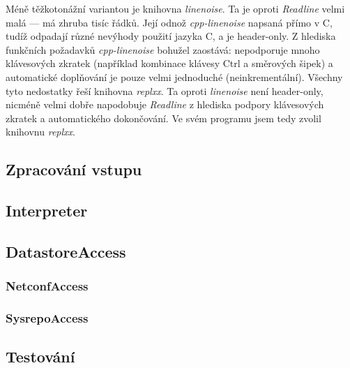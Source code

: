 \documentclass[thesis=B,czech]{FITthesis}[2019/03/06]
\newcommand{\Rplus}{\protect\hspace{-.1em}\protect\raisebox{.35ex}{\smaller{\smaller\textbf{+}}}}
\newcommand{\Cpp}{\mbox{C\Rplus\Rplus}\xspace}
\begin{document}
Méně těžkotonážní variantou je knihovna \textit{linenoise}. Ta je oproti \textit{Readline} velmi malá --- má zhruba tisíc řádků. Její odnož \textit{cpp-linenoise} napsaná přímo v \Cpp{}, tudíž odpadají různé nevýhody použití jazyka C, a je header-only. Z hlediska funkčních požadavků \textit{cpp-linenoise} bohužel zaostává: nepodporuje mnoho klávesových zkratek (například kombinace klávesy Ctrl a směrových šipek) a automatické doplňování je pouze velmi jednoduché (neinkrementální).  Všechny tyto nedostatky řeší knihovna \textit{replxx}. Ta oproti \textit{linenoise} není header-only, nicméně velmi dobře napodobuje \textit{Readline} z hlediska podpory klávesových zkratek a automatického dokončování. Ve svém programu jsem tedy zvolil knihovnu \textit{replxx}.


\subsection{Zpracování vstupu}




\subsection{Interpreter}

\subsection{DatastoreAccess}

\subsubsection{NetconfAccess}

\subsubsection{SysrepoAccess}

\subsection{Testování}
\end{document}
